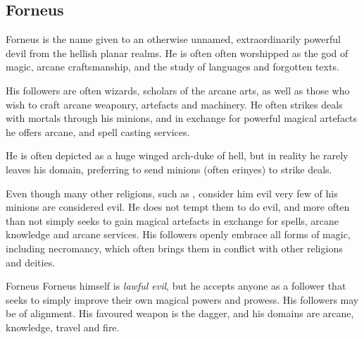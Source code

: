 \subsection{Forneus}
\label{sec:Forneus}

Forneus is the name given to an otherwise unnamed, extraordinarily powerful
devil from the hellish planar realms. He is often often worshipped as the god
of magic, arcane craftsmanship, and the study of languages and forgotten texts.

His followers are often wizards, scholars of the arcane arts, as well as those
who wish to craft arcane weaponry, artefacts and machinery. He often strikes
deals with mortals through his minions, and in exchange for powerful magical
artefacts he offers arcane, and spell casting services.

He is often depicted as a huge winged arch-duke of hell, but in reality he
rarely leaves his domain, preferring to send minions (often erinyes) to
strike deals.

Even though many other religions, such as , consider him evil
very few of his minions are considered evil. He does not tempt them to do
evil, and more often than not simply seeks to gain magical artefacts in
exchange for spells, arcane knowledge and arcane services. His followers openly
embrace all forms of magic, including necromancy, which often brings them in
conflict with other religions and deities.

\begin{35e}{Forneus}
  Forneus himself is \emph{lawful evil}, but he accepts anyone as a follower
  that seeks to simply improve their own magical powers and prowess. His
  followers may be of alignment. His favoured weapon is the dagger, and his
  domains are arcane, knowledge, travel and fire.
\end{35e}
